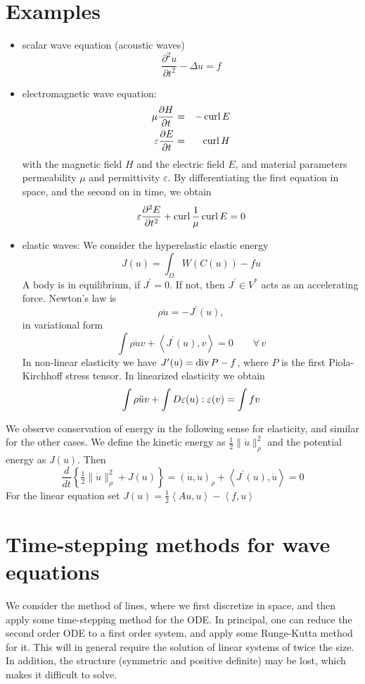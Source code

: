 \section{Examples}
\begin{itemize}
\item scalar wave equation (acoustic waves)
$$
\frac{\partial^2 u}{\partial t^2} - \Delta u = f
$$
\item electromagnetic wave equation: 
\begin{eqnarray*}
\mu \frac{\partial H}{\partial t} & = & -\operatorname{curl} E \\
\varepsilon \frac{\partial E}{\partial t} & = & \operatorname{curl} H
\end{eqnarray*}
with the magnetic field $H$ and the electric field $E$, and material parameters permeability $\mu$ and permittivity $\varepsilon$. By differentiating the first equation in space, and the second on in time, we obtain
$$
\varepsilon \frac{\partial^2 E}{\partial t^2} + \operatorname{curl} \frac{1}{\mu} \operatorname{curl} E = 0
$$
\item elastic waves: We consider the hyperelastic elastic energy
$$
J(u) = \int_\Omega W(C(u)) - f u 
$$
A body is in equilibrium, if $J^\prime = 0$. If not, then $J^\prime \in V^\ast$ acts as an accelerating force. Newton's law is
$$
\rho \ddot u = - J^\prime (u),
$$
in variational form
$$
\int \rho \ddot u v + \left< J^\prime(u), v \right> = 0 \qquad  \forall \, v
$$
In non-linear elasticity we have $J^\prime(u) = \operatorname{div} P - f$, where $P$ is the first Piola-Kirchhoff stress tensor. In linearized elasticity we obtain
$$
\int \rho \ddot u v + \int D \varepsilon(u) : \varepsilon(v) = \int f v 
$$
\end{itemize}

We observe conservation of energy in the following sense for elasticity, and similar for the other cases. We define
the kinetic energy as $\tfrac{1}{2} \| \dot u \|_\rho^2$ and the potential energy as $J(u)$. Then
$$
\frac{d}{dt} \left\{   \tfrac{1}{2} \| \dot u \|_\rho^2 + J(u) \right\} = (\dot u, \ddot u)_\rho + \left< J^\prime(u), \dot u\right> = 0
$$
For the linear equation set $J(u) = \tfrac{1}{2} \left< A u, u \right> - \left< f , u \right>$

\section{Time-stepping methods for wave equations}

We consider the method of lines, where we first discretize in space, and then apply some time-stepping method for the ODE.
In principal, one can reduce the second order ODE to a first order system, and apply some Runge-Kutta method for it. This will in general require the solution of linear systems of twice the size. In addition, the structure (symmetric and positive definite) may be lost, which makes it difficult to solve.  

